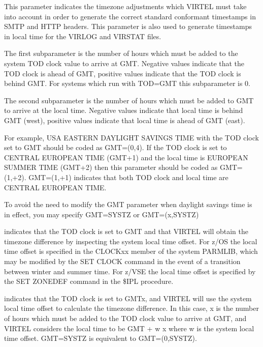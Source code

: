 \documentclass[letterpaper,10pt,english]{sphinxmanual}
\begin{document}
\sphinxAtStartPar
This parameter indicates the timezone adjustments which VIRTEL must take into account in order to generate the correct standard conformant timestamps in SMTP and HTTP headers. This parameter is also used to generate
timestamps in local time for the VIRLOG and VIRSTAT files.

\sphinxAtStartPar
{} \sphinxhyphen{} The first subparameter is the number of hours which must be added to the system TOD clock value to arrive at GMT. Negative values indicate that the TOD clock is ahead of GMT, positive values indicate that the TOD clock is behind GMT. For systems which run with TOD=GMT this subparameter is 0.

\sphinxAtStartPar
{} \sphinxhyphen{} The second subparameter is the number of hours which must be added to GMT to arrive at the local time. Negative values indicate that local time is behind GMT (west), positive values indicate that local time is ahead of GMT (east).

\sphinxAtStartPar
For example, USA EASTERN DAYLIGHT SAVINGS TIME with the TOD clock set to GMT should be coded as GMT=(0,\sphinxhyphen{}4). If the TOD clock is set to CENTRAL EUROPEAN TIME (GMT+1) and the local time is EUROPEAN SUMMER TIME (GMT+2) then this parameter should be coded as GMT=(\sphinxhyphen{}1,+2). GMT=(\sphinxhyphen{}1,+1) indicates that both TOD clock and local time are CENTRAL EUROPEAN TIME.

\sphinxAtStartPar
To avoid the need to modify the GMT parameter when daylight savings time is in effect, you may specify GMT=SYSTZ or GMT=(x,SYSTZ)

\sphinxAtStartPar
{} \sphinxhyphen{} indicates that the TOD clock is set to GMT and that VIRTEL will obtain the timezone difference by inspecting the system local time offset. For z/OS the local time offset is specified in the CLOCKxx member of the system PARMLIB, which may be modified by the SET CLOCK command in the event of a transition between winter and summer time. For z/VSE the local time offset is specified by the SET ZONEDEF command in the \$IPL procedure.

\sphinxAtStartPar
{} \sphinxhyphen{} indicates that the TOD clock is set to GMT\sphinxhyphen{}x, and VIRTEL will use the system local time offset to calculate the timezone difference. In this case, x is the number of hours which must be added to the TOD clock value to arrive at GMT, and VIRTEL considers the local time to be GMT + w \textendash{} x where w is the system local time offset. GMT=SYSTZ is equivalent to GMT=(0,SYSTZ).
\end{document}
